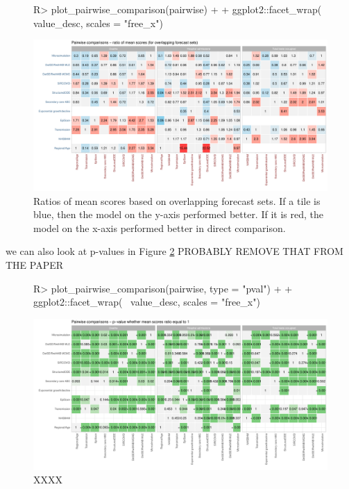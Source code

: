 \documentclass[article,shortnames]{jss}
\begin{document}
\begin{figure}[h!]
\centering
\begin{Schunk}
\begin{Sinput}
R> plot_pairwise_comparison(pairwise) +
+    ggplot2::facet_wrap(~ value_desc, scales = "free_x") 
\end{Sinput}
\end{Schunk}
\includegraphics{plots/plot-pairwise-plot}
\caption{\label{fig:pairwise-comparison} Ratios of mean scores based on overlapping forecast sets. If a tile is blue, then the model on the y-axis performed better. If it is red, the model on the x-axis performed better in direct comparison. }
\end{figure}

we can also look at p-values in Figure \ref{fig:pairwise-comparison-pval} PROBABLY REMOVE THAT FROM THE PAPER
\begin{figure}[h!]
\centering
\begin{Schunk}
\begin{Sinput}
R> plot_pairwise_comparison(pairwise, type = "pval") +
+    ggplot2::facet_wrap(~ value_desc, scales = "free_x") 
\end{Sinput}
\end{Schunk}
\includegraphics{plots/plot-pairwise-plot-ratio}
\caption{\label{fig:pairwise-comparison-pval} XXXX}
\end{figure}
\end{document}
